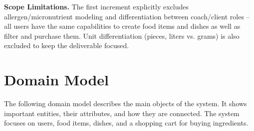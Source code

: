 \documentclass[11pt]{article}
\begin{document}
\textbf{Scope Limitations.} The first increment explicitly excludes allergen/micronutrient modeling and differentiation between coach/client roles – all users have the same capabilities to create food items and dishes as well as filter and purchase them. Unit differentiation (pieces, liters vs. grams) is also excluded to keep the deliverable focused.

\section{Domain Model}

The following domain model describes the main objects of the system. 
It shows important entities, their attributes, and how they are connected. 
The system focuses on users, food items, dishes, and a shopping cart for buying ingredients.
\end{document}
